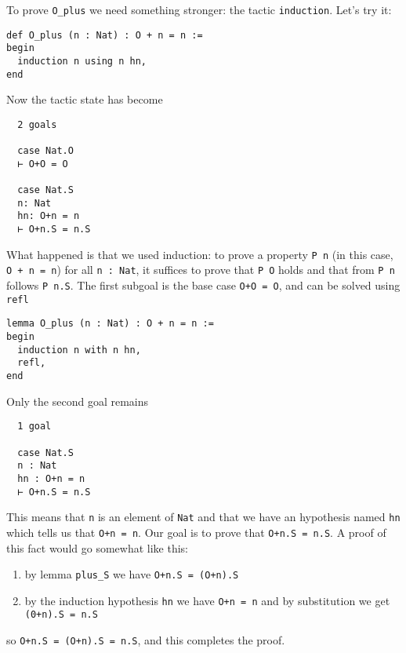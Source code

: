 \documentclass{book}
\theoremstyle{definition}
\theoremstyle{remark}
\theoremstyle{plain}
\begin{document}
To prove \lstinline{O_plus} we need something stronger: the tactic \lstinline{induction}.
Let's try it:
\begin{lstlisting}
def O_plus (n : Nat) : O + n = n :=
begin
  induction n using n hn,
end
\end{lstlisting}
Now the tactic state has become
\begin{lstlisting}
  2 goals

  case Nat.O
  ⊢ O+O = O

  case Nat.S
  n: Nat
  hn: O+n = n
  ⊢ O+n.S = n.S
\end{lstlisting}
What happened is that we used induction:
to prove a property \lstinline{P n} (in this case, \lstinline{O + n = n}) for all \lstinline{n : Nat},
it suffices to prove that \lstinline{P O} holds and that from \lstinline{P n} follows \lstinline{P n.S}.
The first subgoal is the base case \lstinline{O+O = O}, and can be solved using \lstinline{refl}
\begin{lstlisting}
lemma O_plus (n : Nat) : O + n = n :=
begin
  induction n with n hn,
  refl,
end
\end{lstlisting}
Only the second goal remains
\begin{lstlisting}
  1 goal

  case Nat.S
  n : Nat
  hn : O+n = n
  ⊢ O+n.S = n.S
\end{lstlisting}
This means that \lstinline{n} is an element of \lstinline{Nat}
and that we have an hypothesis named \lstinline{hn} which tells us that \lstinline{O+n = n}.
Our goal is to prove that \lstinline{O+n.S = n.S}.
A proof of this fact would go somewhat like this:
\begin{enumerate}
\item by lemma \lstinline{plus_S} we have \lstinline{O+n.S = (O+n).S}
\item by the induction hypothesis \lstinline{hn} we have \lstinline{O+n = n} and by substitution we get \lstinline{(0+n).S = n.S}
\end{enumerate}
so \lstinline{O+n.S = (O+n).S = n.S}, and this completes the proof.
\end{document}
